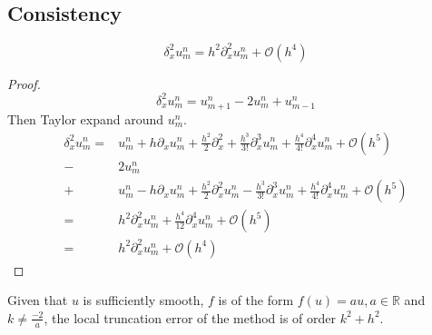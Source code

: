 \subsection{Consistency}

\begin{lemma}
    \label{central_difference}
    $$\delta_x^2u_{m}^{n} = h^2\partial_x^2 u_{m}^{n} + \mathcal{O}(h^4)$$
\end{lemma}
\begin{proof}
    $$\delta_x^2u_{m}^{n} = u_{m+1}^{n} - 2 u_{m}^{n} + u_{m-1}^{n}$$
    Then Taylor expand around $u_{m}^{n}$.
    \begin{align*}
        \delta_x^2u_{m}^{n} =& u_{m}^{n}  + h\partial_xu_{m}^{n} + \frac{h^2}{2}\partial_x^2 + \frac{h^3}{3!}\partial_x^3 u_{m}^{n} + \frac{h^4}{4!}\partial_x^4 u_{m}^{n} + \mathcal{O}(h^5) \\
        -&2u_{m}^{n} \\
        +& u_{m}^{n} - h\partial_xu_{m}^{n} + \frac{h^2}{2}\partial_x^2 u_{m}^{n} - \frac{h^3}{3!}\partial_x^3u_{m}^{n} + \frac{h^4}{4!}\partial_x^4 u_{m}^{n} + \mathcal{O}(h^5) \\
        =& h^2\partial_x^2 u_{m}^{n} + \frac{h^4}{12}\partial_x^4 u_{m}^{n} + \mathcal{O}(h^5) \\
        =&  h^2\partial_x^2 u_{m}^{n} + \mathcal{O}(h^4)
    \end{align*}
\end{proof}

\begin{theorem}
    \label{consistent}
    Given that $u$ is sufficiently smooth,  $f$ is of the form $f(u)=au, a\in \mathbb{R}$ and $k \neq \frac{-2}{a}$, the local truncation error of the method is of order $k^2 + h^2.$
\end{theorem}

